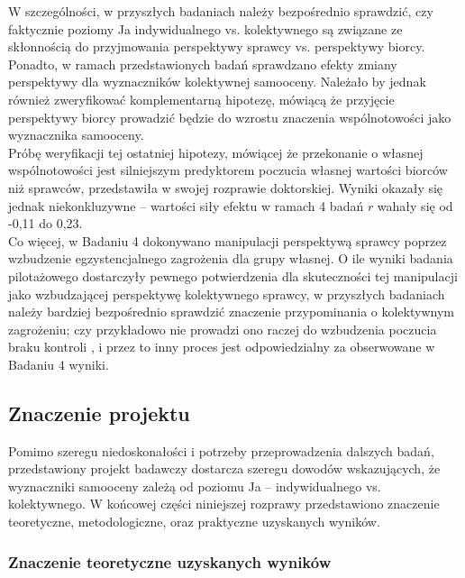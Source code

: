 \documentclass[man]{apa6}
\begin{document}
W szczególności, w przyszłych badaniach należy bezpośrednio sprawdzić, czy faktycznie poziomy Ja indywidualnego vs. kolektywnego są związane ze skłonnością do przyjmowania perspektywy sprawcy vs. perspektywy biorcy. Ponadto, w ramach przedstawionych badań sprawdzano efekty zmiany perspektywy dla wyznaczników kolektywnej samooceny. Należało by jednak również zweryfikować komplementarną hipotezę, mówiącą że przyjęcie perspektywy biorcy prowadzić będzie do wzrostu znaczenia wspólnotowości jako wyznacznika samooceny.\\

Próbę weryfikacji tej ostatniej hipotezy, mówiącej że przekonanie o własnej wspólnotowości jest silniejszym predyktorem poczucia własnej wartości biorców niż sprawców, przedstawiła \textcite{bialobrzeska2015perspektywy} w swojej rozprawie doktorskiej. Wyniki okazały się jednak niekonkluzywne -- wartości siły efektu w ramach 4 badań $r$ wahały się od -0,11 do 0,23. \\

Co więcej, w Badaniu 4 dokonywano manipulacji perspektywą sprawcy poprzez wzbudzenie egzystencjalnego zagrożenia dla grupy własnej. O ile wyniki badania pilotażowego dostarczyły pewnego potwierdzenia dla skuteczności tej manipulacji jako wzbudzającej perspektywę kolektywnego sprawcy, w przyszłych badaniach należy bardziej bezpośrednio sprawdzić znaczenie przypominania o kolektywnym zagrożeniu; czy przykładowo nie prowadzi ono raczej do wzbudzenia poczucia braku kontroli \parencite[patrz, ][]{sullivan2010existential}, i przez to inny proces jest odpowiedzialny za obserwowane w Badaniu 4 wyniki. \\

\subsection{Znaczenie projektu}

Pomimo szeregu niedoskonałości i potrzeby przeprowadzenia dalszych badań, przedstawiony projekt badawczy dostarcza szeregu dowodów wskazujących, że wyznaczniki samooceny zależą od poziomu Ja -- indywidualnego vs. kolektywnego. W końcowej części niniejszej rozprawy przedstawiono znaczenie teoretyczne, metodologiczne, oraz praktyczne uzyskanych wyników.\\

\subsubsection{Znaczenie teoretyczne uzyskanych wyników}
\end{document}
